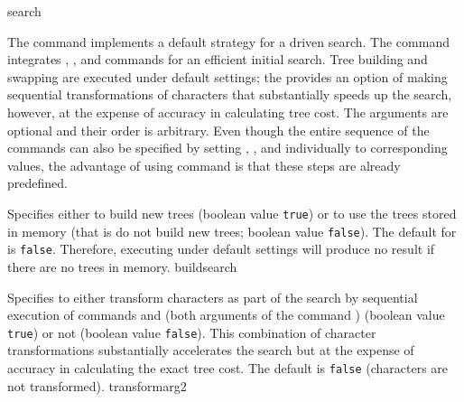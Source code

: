 \begin{command}{search}{}


	\begin{poydescription}
            The command  implements a default strategy for a
            driven search. The command integrates ,
            , and  commands for an
            efficient initial search. Tree building and swapping are executed
            under default settings; the  provides an
            option of making sequential transformations of characters that
            substantially speeds up the search, however, at the expense of
            accuracy in calculating tree cost. The arguments are optional and
            their order is arbitrary. Even though the entire sequence of the commands
            can also be specified by setting ,
            , and  individually to
            corresponding values, the advantage of using 
            command is that these steps are already predefined.
	\end{poydescription}

	\begin{arguments}

            {Specifies either to build new trees (boolean value
            \texttt{true}) or to use the trees stored in memory (that is do not
            build new trees; boolean value \texttt{false}). The default for
             is \texttt{false}. Therefore, executing
             under default settings will produce no result if
            there are no trees in memory.}
            {buildsearch}

            {Specifies to either transform characters as part of the search by
            sequential execution of commands
             and
             (both arguments of the command
            ) (boolean
            value \texttt{true}) or not (boolean value \texttt{false}). 
            This combination of character transformations substantially accelerates the
            search but at the expense of accuracy in calculating the exact tree cost. The
            default is \texttt{false} (characters are not transformed).}
            {transformarg2}


\end{arguments}
\end{command}
